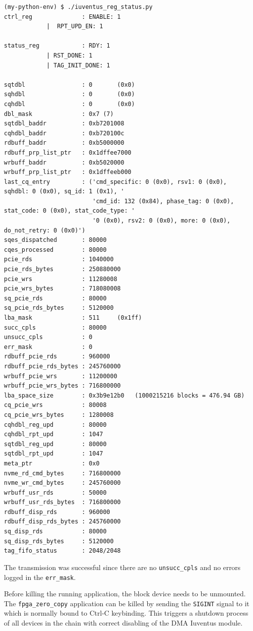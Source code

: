 \begin{lstlisting}[caption={Example of DMA Iuventus status}]
(my-python-env) $ ./iuventus_reg_status.py
ctrl_reg              : ENABLE: 1
			|  RPT_UPD_EN: 1

status_reg            : RDY: 1
			| RST_DONE: 1
			| TAG_INIT_DONE: 1

sqtdbl                : 0		(0x0)
sqhdbl                : 0		(0x0)
cqhdbl                : 0		(0x0)
dbl_mask              : 0x7	(7)
sqtdbl_baddr          : 0xb7201008
cqhdbl_baddr          : 0xb720100c
rdbuff_baddr          : 0xb5000000
rdbuff_prp_list_ptr   : 0x1dffee7000
wrbuff_baddr          : 0xb5020000
wrbuff_prp_list_ptr   : 0x1dffeeb000
last_cq_entry         : ('cmd_specific: 0 (0x0), rsv1: 0 (0x0), sqhdbl: 0 (0x0), sq_id: 1 (0x1), '
                         'cmd_id: 132 (0x84), phase_tag: 0 (0x0), stat_code: 0 (0x0), stat_code_type: '
                         '0 (0x0), rsv2: 0 (0x0), more: 0 (0x0), do_not_retry: 0 (0x0)')
sqes_dispatched       : 80000
cqes_processed        : 80000
pcie_rds              : 1040000
pcie_rds_bytes        : 250880000
pcie_wrs              : 11280008
pcie_wrs_bytes        : 718080008
sq_pcie_rds           : 80000
sq_pcie_rds_bytes     : 5120000
lba_mask              : 511		(0x1ff)
succ_cpls             : 80000
unsucc_cpls           : 0
err_mask              : 0
rdbuff_pcie_rds       : 960000
rdbuff_pcie_rds_bytes : 245760000
wrbuff_pcie_wrs       : 11200000
wrbuff_pcie_wrs_bytes : 716800000
lba_space_size        : 0x3b9e12b0	 (1000215216 blocks = 476.94 GB)
cq_pcie_wrs           : 80008
cq_pcie_wrs_bytes     : 1280008
cqhdbl_reg_upd        : 80000
cqhdbl_rpt_upd        : 1047
sqtdbl_reg_upd        : 80000
sqtdbl_rpt_upd        : 1047
meta_ptr              : 0x0
nvme_rd_cmd_bytes     : 716800000
nvme_wr_cmd_bytes     : 245760000
wrbuff_usr_rds        : 50000
wrbuff_usr_rds_bytes  : 716800000
rdbuff_disp_rds       : 960000
rdbuff_disp_rds_bytes : 245760000
sq_disp_rds           : 80000
sq_disp_rds_bytes     : 5120000
tag_fifo_status       : 2048/2048
\end{lstlisting}

The transmission was successful since there are no \verb|unsucc_cpls| and no errors logged in the
\verb|err_mask|.

Before killing the running application, the block device needs to be unmounted. The
\verb|fpga_zero_copy| application can be killed by sending the \verb|SIGINT| signal to it which is
normally bound to Ctrl-C keybinding. This triggers a shutdown process of all devices in the chain
with correct disabling of the DMA Iuventus module.
